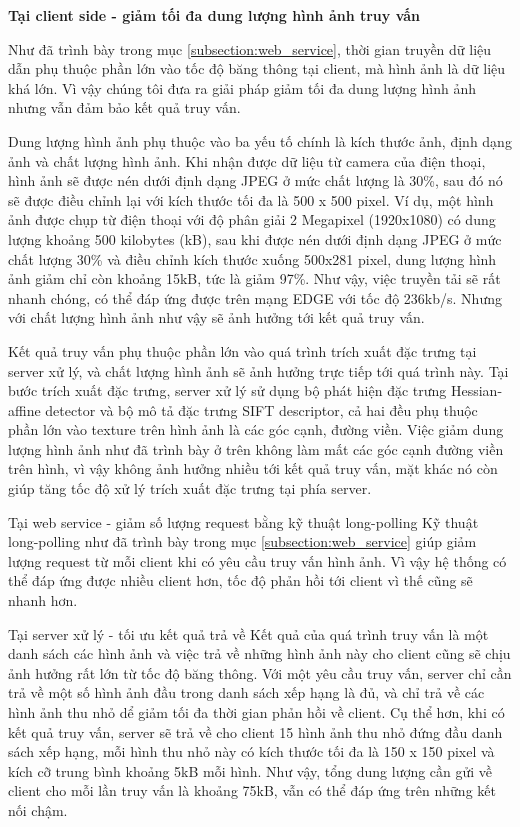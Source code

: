 {\textbf{Tại client side - giảm tối đa dung lượng hình ảnh truy vấn}

Như đã trình bày trong mục \ref{subsection:web_service}, thời gian truyền dữ liệu dẫn phụ thuộc phần lớn vào tốc độ băng thông tại client, mà hình ảnh là dữ liệu khá lớn. Vì vậy chúng tôi đưa ra giải pháp giảm tối đa dung lượng hình ảnh nhưng vẫn đảm bảo kết quả truy vấn.

Dung lượng hình ảnh phụ thuộc vào ba yếu tố chính là kích thước ảnh, định dạng ảnh và chất lượng hình ảnh. Khi nhận được dữ liệu từ camera của điện thoại, hình ảnh sẽ được nén dưới định dạng JPEG ở mức chất lượng là 30\%, sau đó nó sẽ được điều chỉnh lại với kích thước tối đa là 500 x 500 pixel. Ví dụ, một hình ảnh được chụp từ điện thoại với độ phân giải 2 Megapixel (1920x1080) có dung lượng khoảng 500 kilobytes (kB), sau khi được nén dưới định dạng JPEG ở mức chất lượng 30\% và điều chỉnh kích thước xuống 500x281 pixel, dung lượng hình ảnh giảm chỉ còn khoảng 15kB, tức là giảm 97\%. Như vậy, việc truyền tải sẽ rất nhanh chóng, có thể đáp ứng được trên mạng EDGE với tốc độ 236kb/s. Nhưng với chất lượng hình ảnh như vậy sẽ ảnh hưởng tới kết quả truy vấn.

Kết quả truy vấn phụ thuộc phần lớn vào quá trình trích xuất đặc trưng tại server xử lý, và chất lượng hình ảnh sẽ ảnh hưởng trực tiếp tới quá trình này. Tại bước trích xuất đặc trưng, server xử lý sử dụng bộ phát hiện đặc trưng Hessian-affine detector và bộ mô tả đặc trưng SIFT descriptor, cả hai đều phụ thuộc phần lớn vào texture trên hình ảnh là các góc cạnh, đường viền. Việc giảm dung lượng hình ảnh như đã trình bày ở trên không làm mất các góc cạnh đường viền trên hình, vì vậy không ảnh hưởng nhiều tới kết quả truy vấn, mặt khác nó còn giúp tăng tốc độ xử lý trích xuất đặc trưng tại phía server.

Tại web service - giảm số lượng request bằng kỹ thuật long-polling
Kỹ thuật long-polling như đã trình bày trong mục \ref{subsection:web_service} giúp giảm lượng request từ mỗi client khi có yêu cầu truy vấn hình ảnh. Vì vậy hệ thống có thể đáp ứng được nhiều client hơn, tốc độ phản hồi tới client vì thế cũng sẽ nhanh hơn.

Tại server xử lý - tối ưu kết quả trả về
Kết quả của quá trình truy vấn là một danh sách các hình ảnh và việc trả về những hình ảnh này cho client cũng sẽ chịu ảnh hưởng rất lớn từ tốc độ băng thông. Với một yêu cầu truy vấn, server chỉ cần trả về một số hình ảnh đầu trong danh sách xếp hạng là đủ, và chỉ trả về các hình ảnh thu nhỏ dể giảm tối đa thời gian phản hồi về client. Cụ thể hơn, khi có kết quả truy vấn, server sẽ trả về cho client 15 hình ảnh thu nhỏ đứng đầu danh sách xếp hạng, mỗi hình thu nhỏ này có kích thước tối đa là 150 x 150 pixel và kích cỡ trung bình khoảng 5kB mỗi hình. Như vậy, tổng dung lượng cần gửi về client cho mỗi lần truy vấn là khoảng 75kB, vẫn có thể đáp ứng trên những kết nối chậm. 

}

